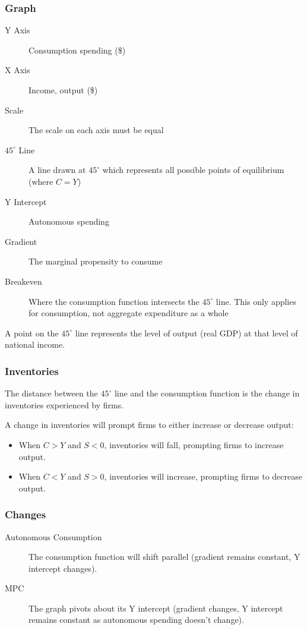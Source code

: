 \documentclass[a4paper,11pt]{article}
\begin{document}
\subsubsection{Graph}


\begin{description}
\item [Y Axis] Consumption spending (\$)
\item [X Axis] Income, output (\$)
\item [Scale] The scale on each axis must be equal
\item [$45^\circ$ Line] A line drawn at $45^\circ$ which represents all possible
	points of equilibrium (where $C = Y$)
\item [Y Intercept] Autonomous spending
\item [Gradient] The marginal propensity to consume
\item [Breakeven] Where the consumption function intersects the $45^\circ$ line.
	This only applies for consumption, not aggregate expenditure as a whole
\end{description}

A point on the $45^\circ$ line represents the level of output (real GDP) at
that level of national income.


\subsubsection{Inventories}

The distance between the $45^\circ$ line and the consumption function is the
change in inventories experienced by firms.

A change in inventories will prompt firms to either increase or decrease
output:

\begin{itemize}
\item When $C > Y$ and $S < 0$, inventories will fall, prompting firms to
	increase output.
\item When $C < Y$ and $S > 0$, inventories will increase, prompting firms to
	decrease output.
\end{itemize}


\subsubsection{Changes}

\begin{description}
\item [Autonomous Consumption] The consumption function will shift parallel
	(gradient remains constant, Y intercept changes).
\item [MPC] The graph pivots about its Y intercept (gradient changes, Y
	intercept remains constant as autonomous spending doesn't change).
\end{description}
\end{document}
